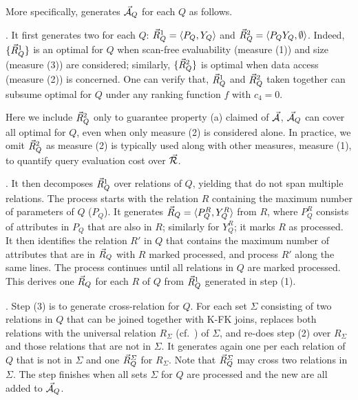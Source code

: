 {More specifically, \usc generates $\vec{{\mathcal A}}_{Q}$ for each $Q$ as follows.

. It first generates two \bss for each $Q$:
$\vec{R}_{Q}^{1} = \langle P_{Q},\allowbreak Y_{Q}\rangle$ and $\vec{R}_{Q}^{2} =
\langle P_{Q}Y_{Q},\allowbreak \emptyset\rangle$. Indeed, $\{\vec{R}_{Q}^{1}\}$ is
an optimal \bds for $Q$ when scan-free evaluability (measure (1))
and size (measure (3)) are considered; similarly,
$\{\vec{R}_{Q}^{2}\}$ is optimal when data access (measure (2)) is
concerned.
One can verify that, $\vec{R}_{Q}^{1}$ and $\vec{R}_{Q}^{2}$ taken
together can subsume optimal \bdss for $Q$ under any ranking
function $f$ with $c_{4} = 0$.

Here we include $\vec{R}_{Q}^{2}$ only to guarantee property (a)
claimed of $\vec{{\mathcal A}}$, \ie $\vec{{\mathcal A}}_{Q}$ can cover all optimal
\bdss for $Q$, even when only measure (2) is considered alone. In
practice, we omit $\vec{R}_{Q}^{2}$ as measure (2) is typically
used along with other measures, \eg measure (1), to quantify
query evaluation cost over $\vec{{\mathcal R}}$.




. It then decomposes $\vec{R}_{Q}^{1}$ over relations of
$Q$, yielding \bss that do not span multiple relations. The
process starts with the relation $R$ containing the maximum
number of parameters of $Q$ (\ie $P_{Q}$). It generates
$\vec{R}_{Q} = \langle P_{Q}^{R},\allowbreak Y_{Q}^{R}\rangle$ from $R$, where
$P_{Q}^{R}$ consists of attributes in $P_{Q}$ that are also in
$R$; similarly for $Y_{Q}^{R}$; it marks $R$ as processed.
It then identifies the relation $R'$ in $Q$ that contains the maximum
number of attributes that are in \bss $\vec{R}_{Q}$ with $R$
marked processed, and process $R'$ along the same lines. The
process continues until all relations in $Q$ are marked
processed. This derives one \bs $\vec{R}_{Q}$ for each $R$ of $Q$
from $\vec{R}_{Q}^{1}$ generated in step (1).



. Step (3) is to generate cross-relation \bss
for $Q$. For each set $\Sigma$ consisting of two relations in $Q$
that can be joined together with K-FK joins, \usc replaces both
relations with the universal relation $R_{\Sigma}$
(cf.~\cite{AbHuVi1995}) of $\Sigma$, and re-does step (2) over
$R_{\Sigma}$ and those relations that are not in $\Sigma$. It
generates again one \bs per each relation of $Q$ that is not in
$\Sigma$ and one \bs $\vec{R}_{Q}^{\Sigma}$ for $R_{\Sigma}$. Note
that $\vec{R}_{Q}^{\Sigma}$ may cross two relations in $\Sigma$.
The step finishes when all sets $\Sigma$ for $Q$ are processed
and the new \bss are all added to $\vec{{\mathcal A}}_{Q}$. 



}
